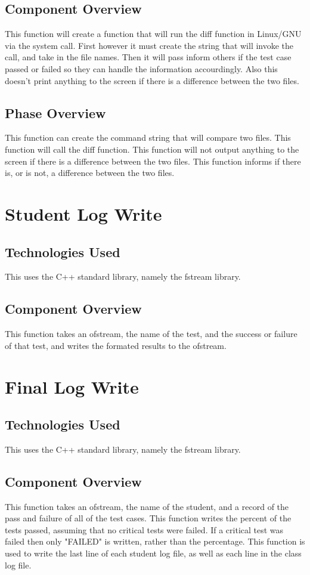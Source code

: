\subsection{Component  Overview}
This function will create a function that will run the diff function in Linux/GNU via the system call.
First however it must create the string that will invoke the call, and take in the file names. Then it 
will pass inform others if the test case passed or failed so they can handle the information accourdingly. 
Also this doesn't print anything to the screen if there is a difference between the two files.

\subsection{Phase Overview}
This function can create the command string that will compare two files. This function will call the diff 
function. This function will not output anything to the screen if there is a difference between the two files. 
This function informs if there is, or is not, a difference between the two files.


\section {Student Log Write}

\subsection {Technologies Used}
This uses the C++ standard library, namely the fstream library.

\subsection {Component Overview}
This function takes an ofstream, the name of the test, and the success or failure of that test, and writes the
formated results to the ofstream.


\section {Final Log Write}

\subsection {Technologies Used}
This uses the C++ standard library, namely the fstream library.

\subsection {Component Overview}
This function takes an ofstream, the name of the student, and a record of the pass and failure of all of the test cases.  
This function writes the percent of the tests passed, assuming that no critical tests were failed.  If a critical test was failed
then only "FAILED" is written, rather than the percentage.  This function is used to write the last line of each student log file,
as well as each line in the class log file.



